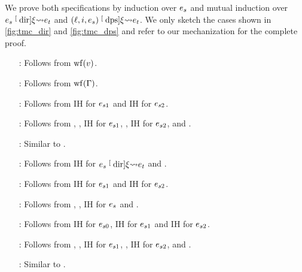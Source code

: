\begin{myproof}
    We prove both specifications by induction over $\datalangExpr_s$ and mutual induction over $\datalangExpr_s \tmcDir{\datalangRenaming} \datalangExpr_t$ and $(\datalangLoc, \datalangIdx, \datalangExpr_s) \tmcDps{\datalangRenaming} \datalangExpr_t$.
    We only sketch the cases shown in \cref{fig:tmc_dir} and \cref{fig:tmc_dps} and refer to our mechanization for the complete proof.
    \begin{itemize}[align=left, leftmargin=*]
        \item[\RefTirName{DirVal}:] Follows from $\wf{\datalangVal}$.
        \item[\RefTirName{DirVar}:] Follows from $\wf{\datalangBisubst}$.
        \item[\RefTirName{DirLet}:] Follows from IH for $\datalangExpr_{s1}$ and IH for $\datalangExpr_{s2}$.
        \item[\RefTirName{DirBlockDPS1}:] Follows from , , IH for $\datalangExpr_{s1}$, , IH for $\datalangExpr_{s2}$,  and .
        \item[\RefTirName{DirBlockDPS2}:] Similar to .
        \item[\RefTirName{DPSBase}:] Follows from IH for $\datalangExpr_s \tmcDir{\datalangRenaming} \datalangExpr_t$ and .
        \item[\RefTirName{DPSLet}:] Follows from IH for $\datalangExpr_{s1}$ and IH for $\datalangExpr_{s2}$.
        \item[\RefTirName{DPSCall}:] Follows from , , IH for $\datalangExpr_s$ and .
        \item[\RefTirName{DPSIf}:] Follows from IH for $\datalangExpr_{s0}$, IH for $\datalangExpr_{s1}$ and IH for $\datalangExpr_{s2}$.
        \item[\RefTirName{DPSBlock1}:] Follows from , , IH for $\datalangExpr_{s1}$, ,  IH for $\datalangExpr_{s2}$,  and .
        \item[\RefTirName{DPSBlock2}:] Similar to . \qedhere
    \end{itemize}
\end{myproof}



